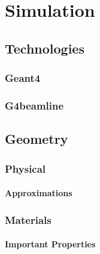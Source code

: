 \part{Simulation} %
\label{prt:simulation}
\chapter{Technologies} %
\label{cha:technologies}
\section{Geant4} %
\label{sec:geant4}

\section{G4beamline} %
\label{sec:g4beamline}

\chapter{Geometry} %
\label{cha:geometry}
\section{Physical} %
\label{sec:physical}
\subsection{Approximations} %
\label{sub:approximations}

\section{Materials} %
\label{sec:materials}
\subsection{Important Properties} %
\label{sub:important_properties}


